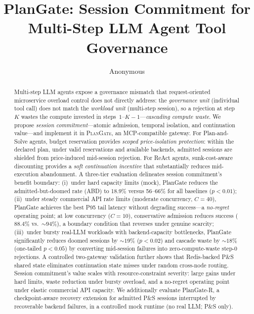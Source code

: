 \documentclass[sigconf,review,anonymous]{acmart}
\begin{document}
\title{PlanGate: Session Commitment for Multi-Step LLM Agent Tool Governance}

\author{Anonymous}

\begin{abstract}
Multi-step LLM agents expose a governance mismatch that request-oriented microservice overload control does not directly address: the \emph{governance unit} (individual tool call) does not match the \emph{workload unit} (multi-step session), so a rejection at step~$K$ wastes the compute invested in steps~$1$--$K{-}1$---\emph{cascading compute waste}. We propose \emph{session commitment}---atomic admission, temporal isolation, and continuation value---and implement it in \textsc{PlanGate}, an MCP-compatible gateway. For Plan-and-Solve agents, budget reservation provides \emph{scoped price-isolation protection}: within the declared plan, under valid reservations and available backends, admitted sessions are shielded from price-induced mid-session rejection. For ReAct agents, sunk-cost-aware discounting provides a \emph{soft continuation incentive} that substantially reduces mid-execution abandonment. A three-tier evaluation delineates session commitment's benefit boundary: (i)~under hard capacity limits (mock), PlanGate reduces the admitted-but-doomed rate (ABD) to 18.9\% versus 56--66\% for all baselines ($p{<}0.01$); (ii)~under steady commercial API rate limits (moderate concurrency, $C{=}40$), PlanGate achieves the best P95 tail latency without degrading success---a \emph{no-regret} operating point; at low concurrency ($C{=}10$), conservative admission reduces success ($88.4$\% vs.\ ${\sim}94$\%), a boundary condition that reverses under genuine scarcity; (iii)~under bursty real-LLM workloads with backend-capacity bottlenecks, PlanGate significantly reduces doomed sessions by ${\sim}19$\% ($p{<}0.02$) and cascade waste by ${\sim}18$\% (one-tailed $p{<}0.05$) by converting mid-session failures into zero-compute-waste step-0 rejections. A controlled two-gateway validation further shows that Redis-backed P\&S shared state eliminates continuation state misses under random cross-node routing. Session commitment's value scales with resource-constraint severity: large gains under hard limits, waste reduction under bursty overload, and a no-regret operating point under elastic commercial API capacity.
We additionally evaluate PlanGate-R, a checkpoint-aware recovery extension for admitted P\&S sessions interrupted by recoverable backend failures, in a controlled mock runtime (no real LLM; P\&S only).
\end{abstract}
\end{document}
